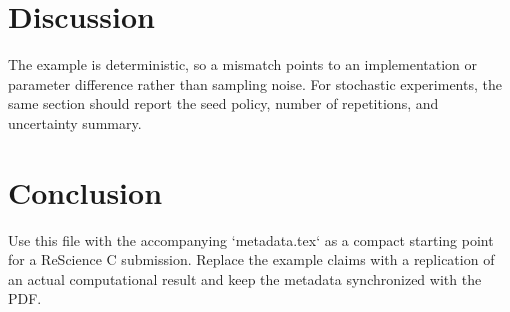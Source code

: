 \documentclass{rescience}
\begin{document}
\section{Discussion}
The example is deterministic, so a mismatch points to an implementation or
parameter difference rather than sampling noise. For stochastic experiments,
the same section should report the seed policy, number of repetitions, and
uncertainty summary.

\section{Conclusion}
Use this file with the accompanying `metadata.tex` as a compact starting point
for a ReScience C submission. Replace the example claims with a replication of
an actual computational result and keep the metadata synchronized with the
PDF.

\hypersetup{linkcolor=black,urlcolor=darkgray}
\renewcommand\emph[1]{{\bfseries #1}}
\setlength\bibitemsep{0pt}
\printbibliography
\end{document}
